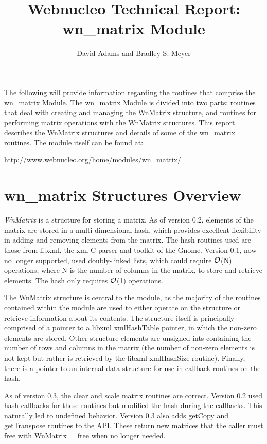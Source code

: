 \documentclass{article}    %
\title{Webnucleo Technical Report: wn\_matrix Module}
\author{David Adams and Bradley S. Meyer}
\begin{document}

\maketitle                 %

The following will provide information regarding the routines that comprise
the wn\_matrix Module. 
The wn\_matrix Module is divided into two parts: routines that deal with 
creating and managing the WnMatrix structure, and routines for performing matrix
operations with the WnMatrix structures. 
This report describes the WnMatrix structures and
details of some of the wn\_matrix routines.
The module itself can be found at:
\begin{center}
http://www.webnucleo.org/home/modules/wn\_matrix/
\end{center}

\section{wn\_matrix Structures Overview}  
                                       
{\em WnMatrix} is a structure for storing a matrix.  As of version 0.2,
elements of the matrix are stored in a multi-dimensional hash,
which provides excellent flexibility in
adding and removing elements from the matrix.
The hash routines used are those from libxml, the xml C parser and toolkit of
the Gnome.  Version 0.1, now no longer supported, used doubly-linked lists,
which could require $\cal O$(N) operations,
where N is the number of columns in the
matrix, to store and retrieve elements.  The hash only requires $\cal O$(1)
operations.

The WnMatrix structure is central to the module, as the majority of
the routines contained 
within the module are used to either operate on the structure or retrieve 
information about its contents.  The structure itself is principally comprised
of a pointer to a libxml xmlHashTable pointer, in which the non-zero elements
are stored.  Other structure elements are unsigned ints containing the
number of rows and columns in the matrix (the number of non-zero elements
is not kept but rather is retrieved by the libxml xmlHashSize routine).
Finally, there is a pointer to an internal data structure for use in callback
routines on the hash.

As of version 0.3, the clear and scale matrix routines are correct.
Version 0.2 used hash callbacks for these routines but modified the hash
during the callbacks.  This naturally led to undefined behavior.  Version
0.3 also adds getCopy and getTranspose routines to the API.  These return
new matrices that the caller must free with WnMatrix\_\_free when no longer
needed.
\end{document}
